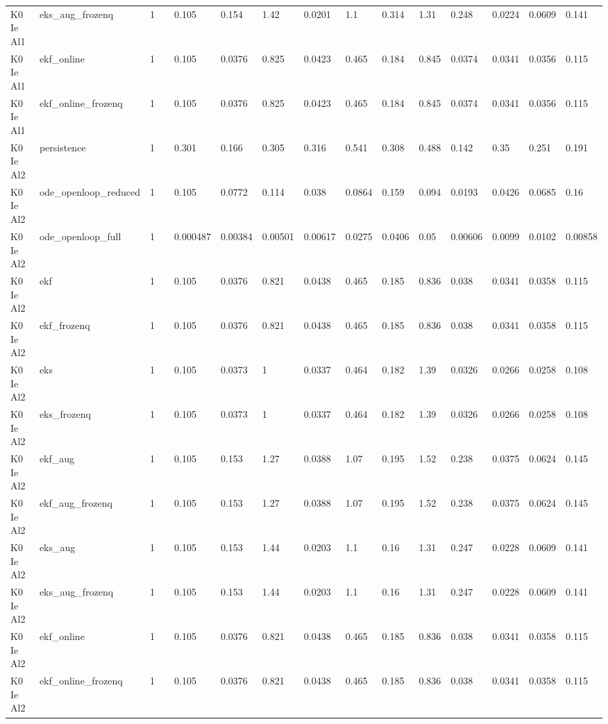 \begin{table}[t]
\begin{tabular}{lllllllllllllll}
K0 Ie Al1 & eks\_aug\_frozenq & 1 &  & 0.105 & 0.154 & 1.42 & 0.0201 & 1.1 & 0.314 & 1.31 & 0.248 & 0.0224 & 0.0609 & 0.141 \\
K0 Ie Al1 & ekf\_online & 1 &  & 0.105 & 0.0376 & 0.825 & 0.0423 & 0.465 & 0.184 & 0.845 & 0.0374 & 0.0341 & 0.0356 & 0.115 \\
K0 Ie Al1 & ekf\_online\_frozenq & 1 &  & 0.105 & 0.0376 & 0.825 & 0.0423 & 0.465 & 0.184 & 0.845 & 0.0374 & 0.0341 & 0.0356 & 0.115 \\
K0 Ie Al2 & persistence & 1 &  & 0.301 & 0.166 & 0.305 & 0.316 & 0.541 & 0.308 & 0.488 & 0.142 & 0.35 & 0.251 & 0.191 \\
K0 Ie Al2 & ode\_openloop\_reduced & 1 &  & 0.105 & 0.0772 & 0.114 & 0.038 & 0.0864 & 0.159 & 0.094 & 0.0193 & 0.0426 & 0.0685 & 0.16 \\
K0 Ie Al2 & ode\_openloop\_full & 1 &  & 0.000487 & 0.00384 & 0.00501 & 0.00617 & 0.0275 & 0.0406 & 0.05 & 0.00606 & 0.0099 & 0.0102 & 0.00858 \\
K0 Ie Al2 & ekf & 1 &  & 0.105 & 0.0376 & 0.821 & 0.0438 & 0.465 & 0.185 & 0.836 & 0.038 & 0.0341 & 0.0358 & 0.115 \\
K0 Ie Al2 & ekf\_frozenq & 1 &  & 0.105 & 0.0376 & 0.821 & 0.0438 & 0.465 & 0.185 & 0.836 & 0.038 & 0.0341 & 0.0358 & 0.115 \\
K0 Ie Al2 & eks & 1 &  & 0.105 & 0.0373 & 1 & 0.0337 & 0.464 & 0.182 & 1.39 & 0.0326 & 0.0266 & 0.0258 & 0.108 \\
K0 Ie Al2 & eks\_frozenq & 1 &  & 0.105 & 0.0373 & 1 & 0.0337 & 0.464 & 0.182 & 1.39 & 0.0326 & 0.0266 & 0.0258 & 0.108 \\
K0 Ie Al2 & ekf\_aug & 1 &  & 0.105 & 0.153 & 1.27 & 0.0388 & 1.07 & 0.195 & 1.52 & 0.238 & 0.0375 & 0.0624 & 0.145 \\
K0 Ie Al2 & ekf\_aug\_frozenq & 1 &  & 0.105 & 0.153 & 1.27 & 0.0388 & 1.07 & 0.195 & 1.52 & 0.238 & 0.0375 & 0.0624 & 0.145 \\
K0 Ie Al2 & eks\_aug & 1 &  & 0.105 & 0.153 & 1.44 & 0.0203 & 1.1 & 0.16 & 1.31 & 0.247 & 0.0228 & 0.0609 & 0.141 \\
K0 Ie Al2 & eks\_aug\_frozenq & 1 &  & 0.105 & 0.153 & 1.44 & 0.0203 & 1.1 & 0.16 & 1.31 & 0.247 & 0.0228 & 0.0609 & 0.141 \\
K0 Ie Al2 & ekf\_online & 1 &  & 0.105 & 0.0376 & 0.821 & 0.0438 & 0.465 & 0.185 & 0.836 & 0.038 & 0.0341 & 0.0358 & 0.115 \\
K0 Ie Al2 & ekf\_online\_frozenq & 1 &  & 0.105 & 0.0376 & 0.821 & 0.0438 & 0.465 & 0.185 & 0.836 & 0.038 & 0.0341 & 0.0358 & 0.115 \\

\end{tabular}
\end{table}
